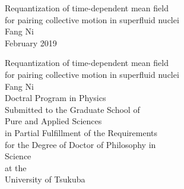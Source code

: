 \documentclass[11pt]{book} %
\begin{document}
\begin{titlepage}
\begin{center}
\vspace*{100truept}
{\huge Requantization of time-dependent mean field}\\
\vspace{5truept}
{\huge for pairing collective motion in superfluid nuclei}\\
\vspace*{120truept}
{\LARGE Fang Ni}\\
\vspace*{280truept}
{\LARGE February 2019}\\ 
\end{center}
\end{titlepage} 
\newpage

\thispagestyle{empty}
\newpage

\begin{titlepage}
\begin{center}
\vspace*{100truept}
{\huge Requantization of time-dependent mean field}\\
\vspace{5truept}
{\huge for pairing collective motion in superfluid nuclei}\\
\vspace*{120truept}
{\LARGE Fang Ni}\\
\vspace{5truept}
{\LARGE Doctral Program in Physics}\\
\vspace*{200truept}
{\LARGE Submitted to the Graduate School of}\\
\vspace{5truept}
{\LARGE Pure and Applied Sciences}\\
\vspace{5truept}
{\LARGE in Partial Fulfillment of the Requirements} \\
\vspace{5truept}
{\LARGE for the Degree of Doctor of Philosophy in}\\
\vspace{5truept}
{\LARGE Science}\\
\vspace*{15truept}
{\LARGE at the}\\
\vspace{5truept}
{\LARGE University of Tsukuba}\\ 
\end{center}
\end{titlepage} 
\thispagestyle{empty}
\end{document}
